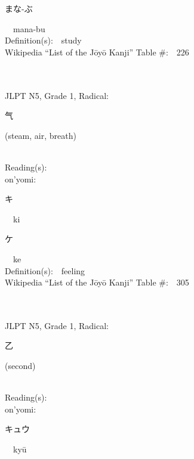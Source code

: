 \begin{multicols}{2}
{\hspace*{2em}}{\begin{CJK}{UTF8}{min} まな-ぶ \end{CJK}}\ \ mana-bu\ \ \\
Definition(s):\ \ study \\
Wikipedia ``List of the J\=oy\=o Kanji'' Table \#:\ \ 226 \\
\ \ \\
{\fontsize{34pt}{40pt}  }\ \ \\  %
{JLPT N5, Grade 1, Radical:\ \ {\begin{CJK}{UTF8}{min} 气 \end{CJK}} (steam, air, breath) } \\
Reading(s):\ \ \\
{\hspace*{1em}}on'yomi:\ \ \\
{\hspace*{2em}}{\begin{CJK}{UTF8}{min} キ \end{CJK}}\ \ ki\ \ \\
{\hspace*{2em}}{\begin{CJK}{UTF8}{min} ケ \end{CJK}}\ \ ke\ \ \\
Definition(s):\ \ feeling \\
Wikipedia ``List of the J\=oy\=o Kanji'' Table \#:\ \ 305 \\
\ \ \\
{\fontsize{34pt}{40pt}  }\ \ \\  %
{JLPT N5, Grade 1, Radical:\ \ {\begin{CJK}{UTF8}{min} 乙 \end{CJK}} (second) } \\
Reading(s):\ \ \\
{\hspace*{1em}}on'yomi:\ \ \\
{\hspace*{2em}}{\begin{CJK}{UTF8}{min} キュウ \end{CJK}}\ \ ky\=u\ \ \\

\end{multicols}
